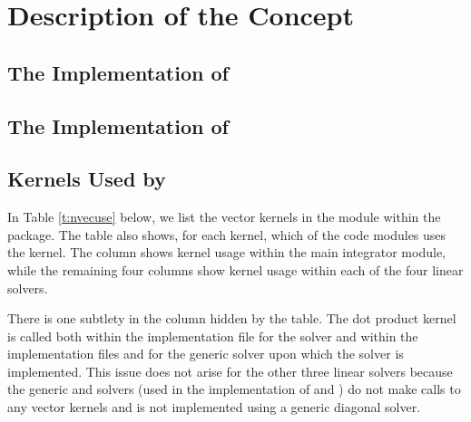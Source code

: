 \chapter{Description of the {\nvector} Concept}\label{s:nvector}


\section{The {\nvecs} Implementation of {\nvector}}\label{ss:nvec_ser}


\section{The {\nvecp} Implementation of {\nvector}}\label{ss:nvec_par}


\section{{\nvector} Kernels Used by {\cvodes}}

In Table \ref{t:nvecuse} below, we list the vector kernels in the 
{\nvector} module within the {\cvodes} package.
The table also shows, for each kernel, which of the code modules uses
the kernel. The {\cvodes} column shows kernel usage within the main
integrator module, while the remaining four columns show kernel usage
within each of the four {\cvodes} linear solvers. 

There is one subtlety in the {\cvspgmr} column hidden by the table. 
The dot product kernel  is called both within the 
implementation file  for the {\cvspgmr} solver and within 
the implementation files  and  for the generic {\spgmr} 
solver upon which the {\cvspgmr} solver is implemented. 
This issue does not arise for the other 
three {\cvodes} linear solvers because the generic {\dense} and {\band} solvers 
(used in the implementation of {\cvdense} and {\cvband}) do not make calls to 
any vector kernels and {\cvdiag} is not implemented using a generic diagonal solver. 

